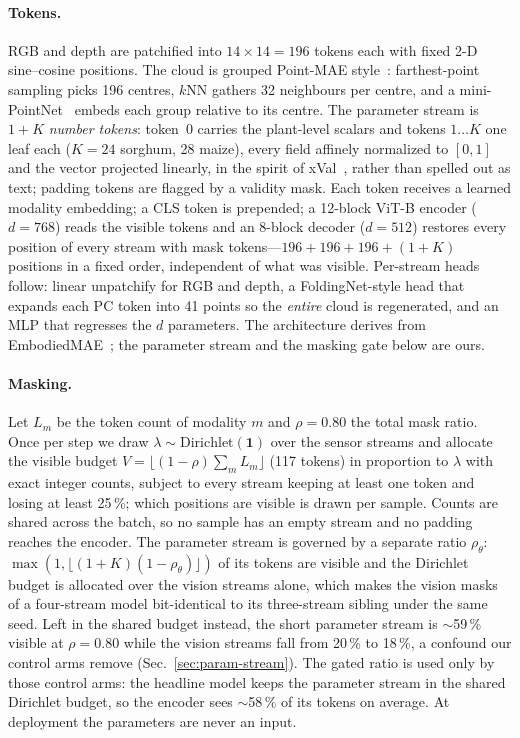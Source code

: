 \paragraph{Tokens.}
RGB and depth are patchified into $14\times14=196$ tokens each with fixed 2-D
sine--cosine positions. The cloud is grouped Point-MAE
style~\cite{pang2022pointmae}: farthest-point sampling picks 196 centres, $k$NN
gathers 32 neighbours per centre, and a mini-PointNet~\cite{qi2017pointnet}
embeds each group relative to its centre. The parameter stream is $1+K$
\emph{number tokens}: token~0 carries the plant-level scalars and tokens
$1\ldots K$ one leaf each ($K{=}24$ sorghum, 28 maize), every field affinely
normalized to $[0,1]$ and the vector projected linearly, in the spirit of
xVal~\cite{golkar2023xval}, rather than spelled out as text; padding tokens are
flagged by a validity mask. Each token receives a learned modality embedding; a
CLS token is prepended; a 12-block ViT-B encoder ($d{=}768$) reads the visible
tokens and an 8-block decoder ($d{=}512$) restores every position of every
stream with mask tokens---$196{+}196{+}196{+}(1{+}K)$ positions in a fixed
order, independent of what was visible. Per-stream heads follow: linear
unpatchify for RGB and depth, a FoldingNet-style head that expands each PC
token into 41 points so the \emph{entire} cloud is regenerated, and an MLP that
regresses the $d$ parameters. The architecture derives from
EmbodiedMAE~\cite{dong2025embodiedmae}; the parameter stream and the masking
gate below are ours.

\paragraph{Masking.}
Let $L_m$ be the token count of modality $m$ and $\rho{=}0.80$ the total mask
ratio. Once per step we draw $\lambda\sim\mathrm{Dirichlet}(\mathbf 1)$ over
the sensor streams and allocate the visible budget
$V=\lfloor(1-\rho)\sum_m L_m\rfloor$ (117 tokens) in proportion to $\lambda$ with
exact integer counts, subject to every stream keeping at least one token and
losing at least 25\,\%; which positions are visible is drawn per sample. Counts
are shared across the batch, so no sample has an empty stream and no padding
reaches the encoder. The parameter stream is governed by a separate ratio
$\rho_\theta$: $\max(1,\lfloor(1+K)(1-\rho_\theta)\rfloor)$ of its tokens are
visible and the Dirichlet budget is allocated over the vision streams alone,
which makes the vision masks of a four-stream model bit-identical to its
three-stream sibling under the same seed. Left in the shared budget instead,
the short parameter stream is $\sim$59\,\% visible at $\rho{=}0.80$ while the
vision streams fall from 20\,\% to 18\,\%, a confound our control arms remove
(Sec.~\ref{sec:param-stream}). The gated ratio is used only by those control
arms: the headline model keeps the parameter stream in the shared Dirichlet
budget, so the encoder sees $\sim$58\,\% of its tokens on average. At
deployment the parameters are never an input.

